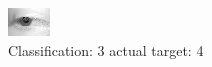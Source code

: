 \begin{figure}[h!]
\begin{center}
\includegraphics[width=0.60\columnwidth]{figures/ID2684_class_3_target_4.png}
\end{center}
\caption{ Classification: 3 actual target: 4}
\label{fig:ID2684_class_3_target_4}
\end{figure}
